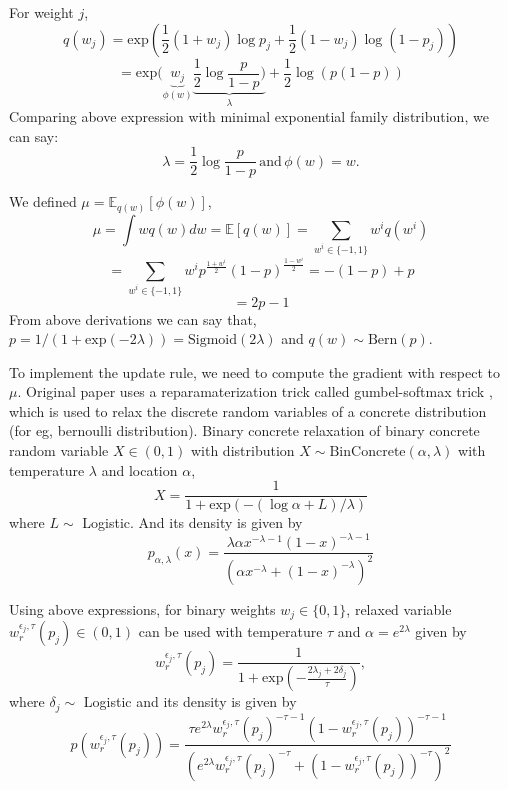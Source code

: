 For weight $j$, \[q(w_j) = \mathrm{exp}(\frac{1}{2}(1+w_j)\log p_j + \frac{1}{2}(1-w_j)\log(1-p_j))\] \[ = \mathrm{exp}(\underbrace{w_j}_{\phi(w)}\underbrace{\frac{1}{2}\log\frac{p}{1-p})}_{\lambda} + \frac{1}{2}\log(p(1-p))\]
Comparing above expression with minimal exponential family distribution, we can say:
\[\lambda = \frac{1}{2}\log\frac{p}{1-p} \, \mathrm{and} \, \phi(w) = w.\]

We defined $\mu = \mathbb{E}_{q(w)}[\phi(w)]$,
\[\mu = \int wq(w)dw = \mathbb{E}[q(w)] = \sum\limits_{w^{i}\in\{-1,1\}}w^{i} q(w^{i}) \] \[= \sum\limits_{w^{i}\in\{-1,1\}}w^{i} p^{\frac{1+w^{i}}{2}}(1-p)^{\frac{1-w^{i}}{2}} = -(1-p) + p\]
\[= 2p-1\]
From above derivations we can say that, $p = 1/(1 + \mathrm{exp}(-2\lambda)) = \mathrm{Sigmoid}(2\lambda)$ and $q(w) \sim \mathrm{Bern}(p)$.

To implement the update rule, we need to compute the gradient with respect to $\mu$. Original paper uses a reparamaterization trick called  gumbel-softmax trick \citet{r7}, which is used to relax the discrete random variables of a concrete distribution (for eg, bernoulli distribution).  Binary concrete relaxation \citet{r7} of binary concrete random variable $X \in (0,1)$ with distribution $X \sim \mathrm{BinConcrete}(\alpha, \lambda)$ with temperature $\lambda$ and location $\alpha $, \[X = \frac{1}{1 + \mathrm{exp}(-(\log\alpha + L)/\lambda)}\] where $L \sim $ Logistic. And its density is given by \[p_{\alpha,\lambda}(x) = \frac{\lambda\alpha x^{-\lambda-1}(1-x)^{-\lambda-1}}{(\alpha x^{-\lambda} + (1-x)^{-\lambda})^{2}}\]

Using above expressions, for binary weights $w_j \in \{0,1\}$, relaxed variable $w_{r}^{\epsilon_{j}, \tau}(p_j) \in (0,1)$ can be used with temperature $\tau$ and $\alpha = e^{2\lambda}$ given by \[ w_{r}^{\epsilon_{j}, \tau}(p_j) = \frac{1}{1 + \mathrm{exp}(-\frac{2\lambda_j + 2\delta_j}{\tau})},\] where $\delta_j \sim$ Logistic and its density is given by \[p(w_{r}^{\epsilon_{j}, \tau}(p_j)) = \frac{\tau e^{2\lambda} w_{r}^{\epsilon_{j}, \tau}(p_j)^{-\tau-1}(1-w_{r}^{\epsilon_{j}, \tau}(p_j))^{-\tau-1}}{(e^{2\lambda} w_{r}^{\epsilon_{j}, \tau}(p_j)^{-\tau} + (1-w_{r}^{\epsilon_{j}, \tau}(p_j))^{-\tau})^{2}}\]